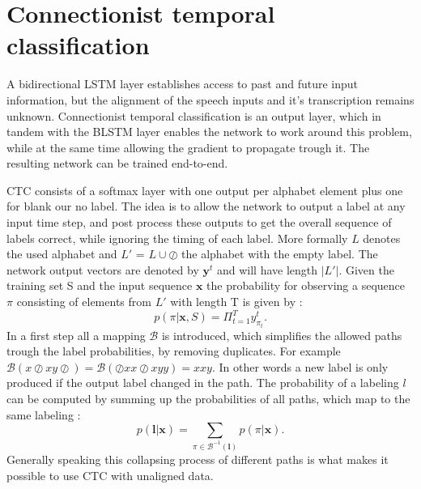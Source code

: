\section{Connectionist temporal classification}
A bidirectional LSTM layer establishes access to past and future input information, but the alignment of the speech inputs and it's transcription remains unknown. Connectionist temporal classification is an output layer, which in tandem with the BLSTM layer enables the network to work around this problem, while at the same time allowing the gradient to propagate trough it. The resulting network can be trained end-to-end.

CTC consists of a softmax layer with one output per alphabet element plus one for blank our no label. The idea is to allow the network to output a label at any input time step, and post process these outputs to get the overall sequence of labels correct, while ignoring the timing of each label.
More formally $L$ denotes the used alphabet and $L'$ = $L \cup \oslash $ the alphabet with the empty label. The network output vectors are denoted by $\mathbf{y}^t$ and will have length $|L'|$. Given the training set S and the input sequence $\mathbf{x}$ the probability for observing a sequence $\pi$ consisting of elements from $L'$ with length T is given by \cite[page 56]{Graves2008}:
\begin{equation}
p(\pi| \mathbf{x}, S) = \Pi_{t=1}^T y^t_{\pi_t}.
\end{equation}
In a first step all a mapping $\mathcal{B}$ is introduced, which simplifies the allowed paths trough the label probabilities, by removing duplicates. For example $\mathcal{B}(x \oslash xy \oslash) = \mathcal{B}(\oslash x x \oslash xyy) = xxy$. In other words a new label is only produced if the output label changed in the path. The probability of a labeling $l$ can be computed by summing up the probabilities of all paths, which map to the same labeling \cite[page 57]{Graves2008}:
\begin{equation}
p(\mathbf{l|\mathbf{x}}) = \sum\limits_{\pi \in \mathcal{B}^{-1}(\mathbf{l})}p(\pi|\mathbf{x}).
\label{eq:CTCPaths}
\end{equation}
Generally speaking this collapsing process of different paths is what makes it possible to use CTC with unaligned data.

